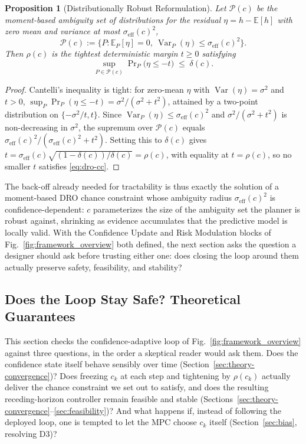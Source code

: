 \documentclass[letterpaper, 10 pt, conference]{ieeeconf}
\newtheorem{proposition}{Proposition}
\begin{document}
\begin{proposition}[Distributionally Robust Reformulation]
\label{prop:dro}
Let $\mathcal P(c)$ be the moment-based ambiguity set of distributions for the residual $\eta=h-\mathbb E[h]$ with zero mean and variance at most $\sigma_{\mathrm{eff}}(c)^2$,
\begin{equation}
\mathcal P(c) := \big\{P : \mathbb E_P[\eta]=0,\ \operatorname{Var}_P(\eta)\le\sigma_{\mathrm{eff}}(c)^2\big\}. \label{eq:ambiguity}
\end{equation}
Then $\rho(c)$ is the tightest deterministic margin $t\ge0$ satisfying
\begin{equation}
\sup_{P\in\mathcal P(c)} \Pr\nolimits_P\big(\eta\le -t\big) \;\le\; \delta(c). \label{eq:dro-cc}
\end{equation}
\end{proposition}
\begin{proof}
Cantelli's inequality is tight: for zero-mean $\eta$ with $\operatorname{Var}(\eta)=\sigma^2$ and $t>0$, $\sup_{P}\Pr_P(\eta\le-t)=\sigma^2/(\sigma^2+t^2)$, attained by a two-point distribution on $\{-\sigma^2/t,t\}$. Since $\operatorname{Var}_P(\eta)\le\sigma_{\mathrm{eff}}(c)^2$ and $\sigma^2/(\sigma^2+t^2)$ is non-decreasing in $\sigma^2$, the supremum over $\mathcal P(c)$ equals $\sigma_{\mathrm{eff}}(c)^2/(\sigma_{\mathrm{eff}}(c)^2+t^2)$. Setting this to $\delta(c)$ gives $t=\sigma_{\mathrm{eff}}(c)\sqrt{(1-\delta(c))/\delta(c)}=\rho(c)$, with equality at $t=\rho(c)$, so no smaller $t$ satisfies \eqref{eq:dro-cc}.
\end{proof}

The back-off already needed for tractability is thus exactly the solution of a moment-based DRO chance constraint whose ambiguity radius $\sigma_{\mathrm{eff}}(c)^2$ is confidence-dependent: $c$ parameterizes the size of the ambiguity set the planner is robust against, shrinking as evidence accumulates that the predictive model is locally valid. With the Confidence Update and Risk Modulation blocks of Fig.~\ref{fig:framework_overview} both defined, the next section asks the question a designer should ask before trusting either one: does closing the loop around them actually preserve safety, feasibility, and stability?

\subsection{Does the Loop Stay Safe? Theoretical Guarantees}
\label{sec:theory}

This section checks the confidence-adaptive loop of Fig.~\ref{fig:framework_overview} against three questions, in the order a skeptical reader would ask them. Does the confidence state itself behave sensibly over time (Section~\ref{sec:theory-convergence})? Does freezing $c_k$ at each step and tightening by $\rho(c_k)$ actually deliver the chance constraint we set out to satisfy, and does the resulting receding-horizon controller remain feasible and stable (Sections~\ref{sec:theory-convergence}--\ref{sec:feasibility})? And what happens if, instead of following the deployed loop, one is tempted to let the MPC choose $c_k$ itself (Section~\ref{sec:bias}, resolving D3)?
\end{document}

